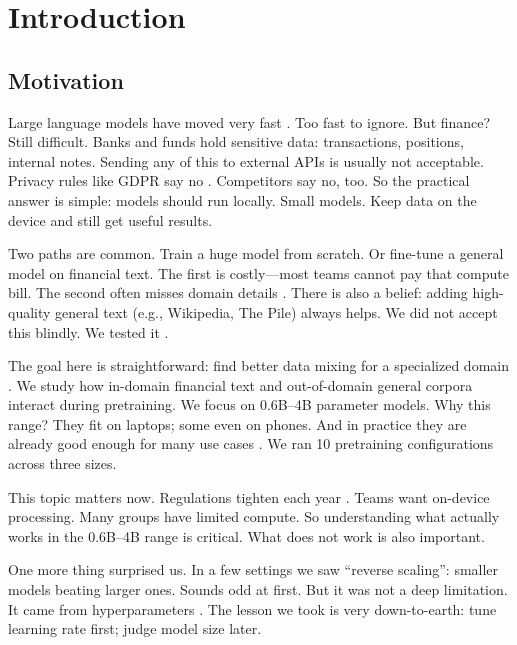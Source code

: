 \chapter{Introduction}

\section{Motivation}

Large language models have moved very fast \parencite{vaswani2017attention,radford2019language,brown2020language,touvron2023llama}. Too fast to ignore. But finance? Still difficult. Banks and funds hold sensitive data: transactions, positions, internal notes. Sending any of this to external APIs is usually not acceptable. Privacy rules like GDPR say no \parencite{eu2016gdpr}. Competitors say no, too. So the practical answer is simple: models should run locally. Small models. Keep data on the device and still get useful results.

Two paths are common. Train a huge model from scratch. Or fine-tune a general model on financial text. The first is costly—most teams cannot pay that compute bill. The second often misses domain details \parencite{gururangan2020don}. There is also a belief: adding high-quality general text (e.g., Wikipedia, The Pile) always helps. We did not accept this blindly. We tested it \parencite{gao2020pile,raffel2020exploring,longpre2023pretrainer}.

The goal here is straightforward: find better data mixing for a specialized domain \parencite{wu2023bloomberggpt}. We study how in-domain financial text and out-of-domain general corpora interact during pretraining. We focus on 0.6B–4B parameter models. Why this range? They fit on laptops; some even on phones. And in practice they are already good enough for many use cases \parencite{yang2024qwen2,xia2023sheared,team2024gemma,javaheripi2023phi}. We ran 10 pretraining configurations across three sizes.

This topic matters now. Regulations tighten each year \parencite{eu2016gdpr}. Teams want on-device processing. Many groups have limited compute. So understanding what actually works in the 0.6B--4B range is critical. What does not work is also important.

One more thing surprised us. In a few settings we saw ``reverse scaling'': smaller models beating larger ones. Sounds odd at first. But it was not a deep limitation. It came from hyperparameters \parencite{kaplan2020scaling,hoffmann2022training,mccandlish2018empirical}. The lesson we took is very down-to-earth: tune learning rate first; judge model size later.

